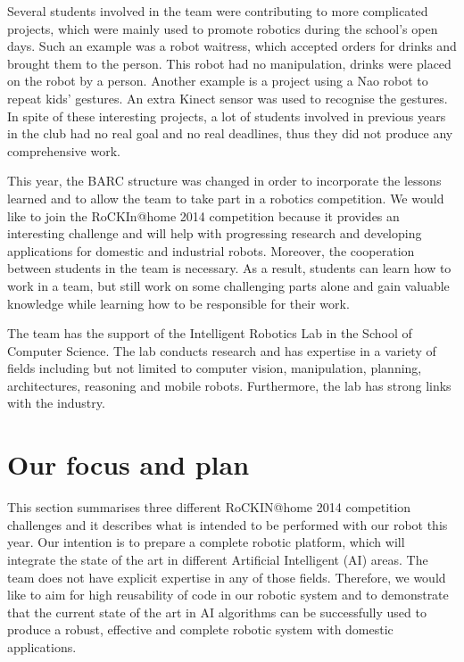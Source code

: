 \documentclass[conference]{IEEEtran}
\begin{document}
Several students involved in the team were contributing to more complicated projects, which were mainly used to promote robotics during the school's open days. Such an example was a robot waitress, which accepted orders for drinks and brought them to the person. This robot had no manipulation, drinks were placed on the robot by a person. Another example is a project using a Nao robot to repeat kids' gestures. An extra Kinect sensor was used to recognise the gestures. In spite of these interesting projects, a lot of students involved in previous years in the club had no real goal and no real deadlines, thus they did not produce any comprehensive work.

This year, the BARC structure was changed in order to incorporate the lessons learned and to allow the team to take part in a robotics competition. We would like to join the RoCKIn@home 2014 competition because it provides an interesting challenge and will help with progressing research and developing applications for domestic and industrial robots. Moreover, the cooperation between students in the team is necessary. As a result, students can learn how to work in a team, but still work on some challenging parts alone and gain valuable knowledge while learning how to be responsible for their work.

The team has the support of the Intelligent Robotics Lab \cite{irlab} in the School of Computer Science. The lab conducts research and has expertise in a variety of fields including but not limited to computer vision, manipulation, planning, architectures, reasoning and mobile robots. Furthermore, the lab has strong links with the industry. 

 
\section{Our focus and plan}

This section summarises three different RoCKIN@home 2014 competition challenges and it describes what is intended to be performed with our robot this year. Our intention is to prepare a complete robotic platform, which will integrate the state of the art in different Artificial Intelligent (AI) areas. The team does not have explicit expertise in any of those fields. Therefore, we would like to aim for high reusability of code in our robotic system and to demonstrate that the current state of the art in AI algorithms can be successfully used to produce a robust, effective and complete robotic system with domestic applications.  
\end{document}
